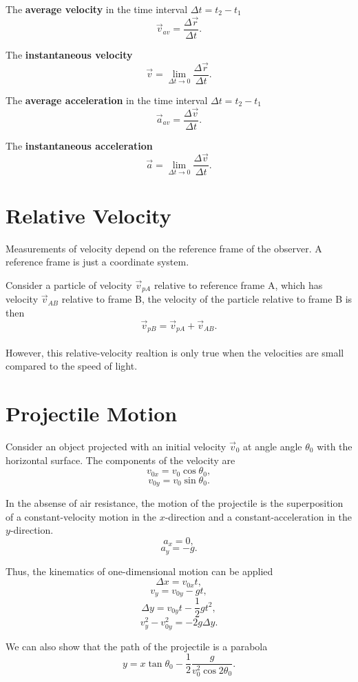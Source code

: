 \documentclass[11pt,letter]{report}
\begin{document}
\noindent
The \textbf{average velocity} in the time interval $\Delta{t} = t_2 - t_1$ $$\vec{v}_{av} = \frac{\Delta{\vec{r}}}{\Delta{t}}.$$

\noindent
The \textbf{instantaneous velocity} $$\vec{v} = \lim_{\Delta{t} \to 0} \frac{\Delta{\vec{r}}}{\Delta{t}}.$$

\noindent
The \textbf{average acceleration} in the time interval $\Delta{t} = t_2 - t_1$ $$\vec{a}_{av} = \frac{\Delta{\vec{v}}}{\Delta{t}}.$$

\noindent
The \textbf{instantaneous acceleration} $$\vec{a} = \lim_{\Delta{t} \to 0} \frac{\Delta{\vec{v}}}{\Delta{t}}.$$

\section*{Relative Velocity}

Measurements of velocity depend on the reference frame of the observer. A reference frame is just a coordinate system.

\noindent
Consider a particle of velocity $\vec{v}_{pA}$ relative to reference frame A, which has velocity $\vec{v}_{AB}$ relative to frame B, the velocity of the particle relative to frame B is then $$\vec{v}_{pB} = \vec{v}_{pA} + \vec{v}_{AB}.$$\\However, this relative-velocity realtion is only true when the velocities are small compared to the speed of light.
\section*{Projectile Motion}

Consider an object projected with an initial velocity $\vec{v}_0$ at angle angle $\theta_0$ with the horizontal surface. The components of the velocity are $$v_{0x} = v_0 \cos{\theta_0},$$ $$v_{0y} = v_0 \sin{\theta_0}.$$

\noindent
In the absense of air resistance, the motion of the projectile is the superposition of a constant-velocity motion in the $x$-direction and a constant-acceleration in the $y$-direction. $$a_x = 0,$$ $$a_y = -g.$$

\noindent
Thus, the kinematics of one-dimensional motion can be applied $$\Delta{x} = v_{0x} t,$$ $$v_y = v_{0y} - gt,$$ $$\Delta{y} = v_{0y} t - \frac{1}{2} gt^2,$$ $$v_y^2 - v_{0y}^2 = -2g \Delta{y}.$$

We can also show that the path of the projectile is a parabola $$y = x\tan{\theta_0} - \frac{1}{2} \frac{g}{v_0^2 \cos{2\theta_0}}.$$
\end{document}
